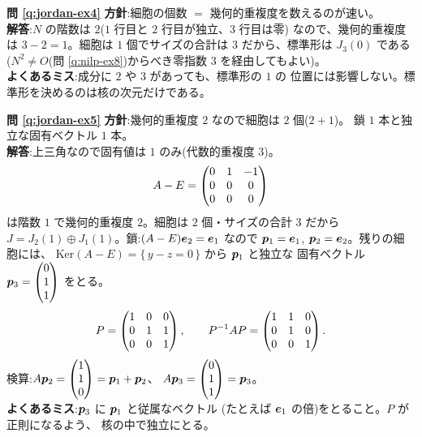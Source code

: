 \bigskip
\noindent\textbf{問 \ref{q:jordan-ex4}}\quad
\textbf{方針}:細胞の個数 $=$ 幾何的重複度を数えるのが速い。\\
\textbf{解答}:$N$ の階数は $2$($1$ 行目と $2$ 行目が独立、$3$ 行目は零)
なので、幾何的重複度は $3 - 2 = 1$。細胞は $1$ 個でサイズの合計は $3$
だから、標準形は $J_3(0)$ である
($N^2 \neq O$(問 \ref{q:nilp-ex8})からべき零指数 $3$ を経由してもよい)。\\
\textbf{よくあるミス}:成分に $2$ や $3$ があっても、標準形の $1$ の
位置には影響しない。標準形を決めるのは核の次元だけである。

\bigskip
\noindent\textbf{問 \ref{q:jordan-ex5}}\quad
\textbf{方針}:幾何的重複度 $2$ なので細胞は $2$ 個($2 + 1$)。
鎖 $1$ 本と独立な固有ベクトル $1$ 本。\\
\textbf{解答}:上三角なので固有値は $1$ のみ(代数的重複度 $3$)。
\[
A - E = \begin{pmatrix}0 & 1 & -1 \\ 0 & 0 & 0 \\ 0 & 0 & 0\end{pmatrix}
\]
は階数 $1$ で幾何的重複度 $2$。細胞は $2$ 個・サイズの合計 $3$ だから
$J = J_2(1) \oplus J_1(1)$。鎖:$(A - E)\bm{e}_2 = \bm{e}_1$ なので
$\bm{p}_1 = \bm{e}_1$, $\bm{p}_2 = \bm{e}_2$。残りの細胞には、
$\mathrm{Ker}(A - E) = \{\, y - z = 0 \,\}$ から $\bm{p}_1$ と独立な
固有ベクトル $\bm{p}_3 = \begin{pmatrix}0 \\ 1 \\ 1\end{pmatrix}$ をとる。
\[
P = \begin{pmatrix}1 & 0 & 0 \\ 0 & 1 & 1 \\ 0 & 0 & 1\end{pmatrix}, \qquad
P^{-1}AP = \begin{pmatrix}1 & 1 & 0 \\ 0 & 1 & 0 \\ 0 & 0 & 1\end{pmatrix}.
\]
検算:$A\bm{p}_2 = \begin{pmatrix}1 \\ 1 \\ 0\end{pmatrix} = \bm{p}_1 + \bm{p}_2$、
$A\bm{p}_3 = \begin{pmatrix}0 \\ 1 \\ 1\end{pmatrix} = \bm{p}_3$。\\
\textbf{よくあるミス}:$\bm{p}_3$ に $\bm{p}_1$ と従属なベクトル
(たとえば $\bm{e}_1$ の倍)をとること。$P$ が正則になるよう、
核の中で独立にとる。

